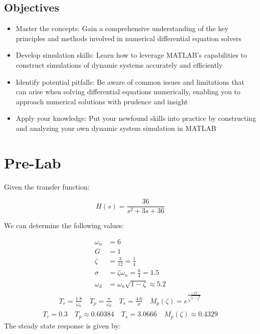 \documentclass[12pt]{article}
\begin{document}
	\subsection{Objectives}
	\begin{itemize}
		\item Master the concepts: Gain a comprehensive understanding of the key principles and methods involved in numerical differential equation solvers
		\item Develop simulation skills: Learn how to leverage MATLAB's capabilities to construct simulations of dynamic systems accurately and efficiently
		\item Identify potential pitfalls: Be aware of common issues and limitations that can arise when solving differential equations numerically, enabling you to approach numerical solutions with prudence and insight
		\item Apply your knowledge: Put your newfound skills into practice by constructing and analyzing your own dynamic system simulation in MATLAB
	\end{itemize}
	
	\section{Pre-Lab}
		Given the transfer function:
		
		$$
		H(s)=\frac{36}{s^{2}+3 s+36}
		$$
		
		We can determine the following values:
		
		$$
		\begin{aligned}
			\omega_{n} & =6 \\
			G & =1 \\
			\zeta & =\frac{3}{12} = \frac{1}{4}  \\
			\sigma & =\zeta \omega_{n}= \frac{6}{4} = 1.5\\
			\omega_{d} & =\omega_{n} \sqrt{1-\zeta} \approx 5.2
		\end{aligned}
		$$
		$$
		\begin{aligned}
			T_r=\frac{1.8}{\omega_n} \ &
			T_p=\frac{\pi}{\omega_{d}} \  &
			T_s=\frac{4.6}{\sigma} \ &
			M_p(\zeta) = e^{\frac {- \zeta \pi }{\sqrt{1-\zeta^{2}}}}
		\end{aligned}
		$$
		$$
		\begin{aligned}
			T_r= 0.3 \ &
			T_p \approx 0.60384 \ &
			T_s = 3.066\overline{6} \ &
			M_p(\zeta) \approx 0.4329
		\end{aligned}
		$$
		The steady state response is given by:
		
\end{document}
